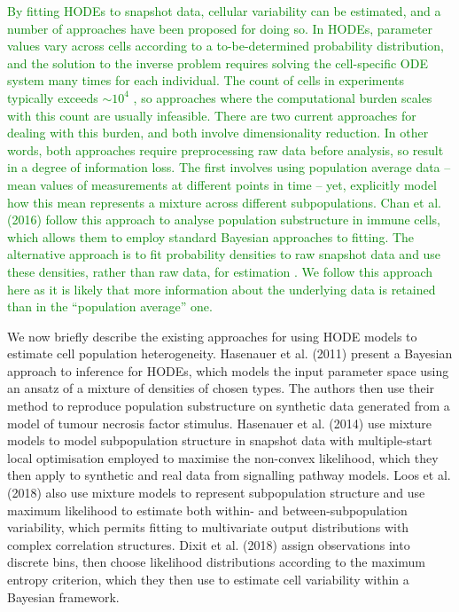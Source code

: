 \textcolor{green}{By fitting HODEs to snapshot data, cellular variability can be estimated, and a number of approaches have been proposed for doing so. In HODEs, parameter values vary across cells according to a to-be-determined probability distribution, and the solution to the inverse problem requires solving the cell-specific ODE system many times for each individual. The count of cells in experiments typically exceeds $\sim10^4$ \cite{hasenauer2011identification}, so approaches where the computational burden scales with this count are usually infeasible. There are two current approaches for dealing with this burden, and both involve dimensionality reduction.  In other words, both approaches require preprocessing raw data before analysis, so result in a degree of information loss. The first involves using population average data -- mean values of measurements at different points in time -- yet, explicitly model how this mean represents a mixture across different subpopulations. Chan et al. (2016) \cite{chan2016subpopulation} follow this approach to analyse population substructure in immune cells, which allows them to employ standard Bayesian approaches to fitting. The alternative approach is to fit probability densities to raw snapshot data and use these densities, rather than raw data, for estimation \cite{hasenauer2011identification,hasenauer2014ode,loos2018hierarchical,dixit2018maximum}. We follow this approach here as it is likely that more information about the underlying data is retained than in the ``population average'' one.}

We now briefly describe the existing approaches for using HODE models to estimate cell population heterogeneity. Hasenauer et al. (2011) \cite{hasenauer2011identification} present a Bayesian approach to inference for HODEs, which models the input parameter space using an ansatz of a mixture of densities of chosen types. The authors then use their method to reproduce population substructure on synthetic data generated from a model of tumour necrosis factor stimulus. Hasenauer et al. (2014) \cite{hasenauer2014ode} use mixture models to model subpopulation structure in snapshot data with multiple-start local optimisation employed to maximise the non-convex likelihood, which they then apply to synthetic and real data from signalling pathway models. Loos et al. (2018) \cite{loos2018hierarchical} also use mixture models to represent subpopulation structure and use maximum likelihood to estimate both within- and between-subpopulation variability, which permits fitting to multivariate output distributions with complex correlation structures. Dixit et al. (2018) \cite{dixit2018maximum} assign observations into discrete bins, then choose likelihood distributions according to the maximum entropy criterion, which they then use to estimate cell variability  within a Bayesian framework.

